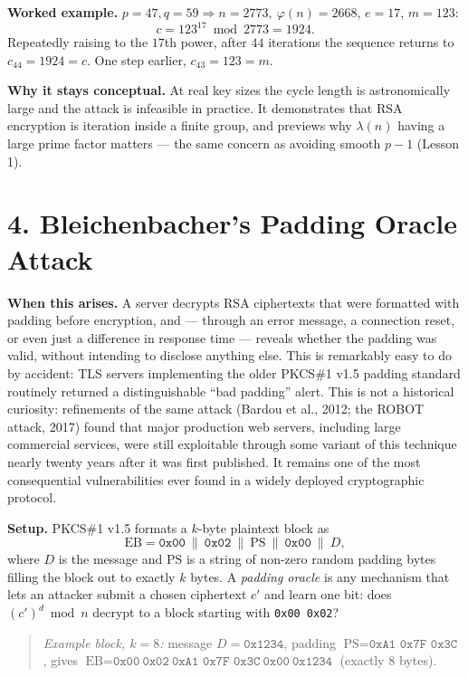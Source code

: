 \documentclass[11pt]{article}
\begin{document}
\textbf{Worked example.} $p=47,q=59\Rightarrow n=2773,\ \varphi(n)=2668$, $e=17$, $m=123$:
\[
c=123^{17}\bmod2773=1924.
\]
Repeatedly raising to the $17$th power, after $44$ iterations the sequence returns to $c_{44}=1924=c$. One step earlier, $c_{43}=123=m$.

\textbf{Why it stays conceptual.} At real key sizes the cycle length is astronomically large and the attack is infeasible in practice. It demonstrates that RSA encryption is iteration inside a finite group, and previews why $\lambda(n)$ having a large prime factor matters --- the same concern as avoiding smooth $p-1$ (Lesson 1).

\hrulefill

\section*{4. Bleichenbacher's Padding Oracle Attack}

\textbf{When this arises.} A server decrypts RSA ciphertexts that were formatted with padding before encryption, and --- through an error message, a connection reset, or even just a difference in response time --- reveals whether the padding was valid, without intending to disclose anything else. This is remarkably easy to do by accident: TLS servers implementing the older PKCS\#1 v1.5 padding standard routinely returned a distinguishable ``bad padding'' alert. This is not a historical curiosity: refinements of the same attack (Bardou et al., 2012; the ROBOT attack, 2017) found that major production web servers, including large commercial services, were still exploitable through some variant of this technique nearly twenty years after it was first published. It remains one of the most consequential vulnerabilities ever found in a widely deployed cryptographic protocol.

\textbf{Setup.} PKCS\#1 v1.5 formats a $k$-byte plaintext block as
\[
\text{EB} = \texttt{0x00}\ \|\ \texttt{0x02}\ \|\ \text{PS}\ \|\ \texttt{0x00}\ \|\ D,
\]
where $D$ is the message and PS is a string of non-zero random padding bytes filling the block out to exactly $k$ bytes. A \emph{padding oracle} is any mechanism that lets an attacker submit a chosen ciphertext $c'$ and learn one bit: does $(c')^d\bmod n$ decrypt to a block starting with \texttt{0x00 0x02}?

\begin{quote}
\emph{Example block, $k=8$:} message $D=\texttt{0x1234}$, padding $\text{PS}=\texttt{0xA1 0x7F 0x3C}$, gives
$\text{EB} = \texttt{0x00}\ \texttt{0x02}\ \texttt{0xA1 0x7F 0x3C}\ \texttt{0x00}\ \texttt{0x1234}$ (exactly 8 bytes).
\end{quote}
\end{document}
